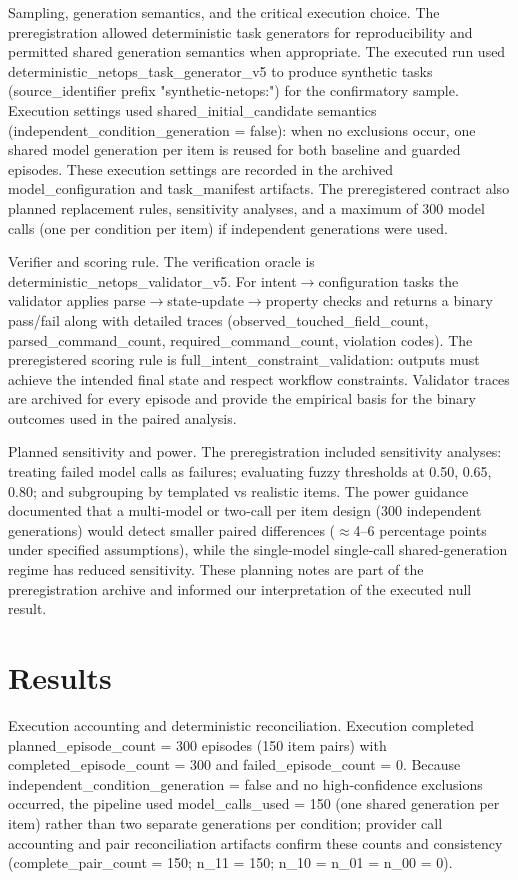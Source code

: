 \documentclass[conference]{IEEEtran}
\begin{document}
Sampling, generation semantics, and the critical execution choice. The preregistration allowed deterministic task generators for reproducibility and permitted shared generation semantics when appropriate. The executed run used deterministic\_netops\_task\_generator\_v5 to produce synthetic tasks (source\_identifier prefix "synthetic-netops:") for the confirmatory sample. Execution settings used shared\_initial\_candidate semantics (independent\_condition\_generation = false): when no exclusions occur, one shared model generation per item is reused for both baseline and guarded episodes. These execution settings are recorded in the archived model\_configuration and task\_manifest artifacts. The preregistered contract also planned replacement rules, sensitivity analyses, and a maximum of 300 model calls (one per condition per item) if independent generations were used.

Verifier and scoring rule. The verification oracle is deterministic\_netops\_validator\_v5. For intent\ensuremath{\rightarrow}configuration tasks the validator applies parse\ensuremath{\rightarrow}state‑update\ensuremath{\rightarrow}property checks and returns a binary pass/fail along with detailed traces (observed\_touched\_field\_count, parsed\_command\_count, required\_command\_count, violation codes). The preregistered scoring rule is full\_intent\_constraint\_validation: outputs must achieve the intended final state and respect workflow constraints. Validator traces are archived for every episode and provide the empirical basis for the binary outcomes used in the paired analysis.

Planned sensitivity and power. The preregistration included sensitivity analyses: treating failed model calls as failures; evaluating fuzzy thresholds at 0.50, 0.65, 0.80; and subgrouping by templated vs realistic items. The power guidance documented that a multi‑model or two‑call per item design (300 independent generations) would detect smaller paired differences (\ensuremath{\approx}4--6 percentage points under specified assumptions), while the single‑model single‑call shared‑generation regime has reduced sensitivity. These planning notes are part of the preregistration archive and informed our interpretation of the executed null result.

\section{Results}
Execution accounting and deterministic reconciliation. Execution completed planned\_episode\_count = 300 episodes (150 item pairs) with completed\_episode\_count = 300 and failed\_episode\_count = 0. Because independent\_condition\_generation = false and no high‑confidence exclusions occurred, the pipeline used model\_calls\_used = 150 (one shared generation per item) rather than two separate generations per condition; provider call accounting and pair reconciliation artifacts confirm these counts and consistency (complete\_pair\_count = 150; n\_11 = 150; n\_10 = n\_01 = n\_00 = 0).
\end{document}
